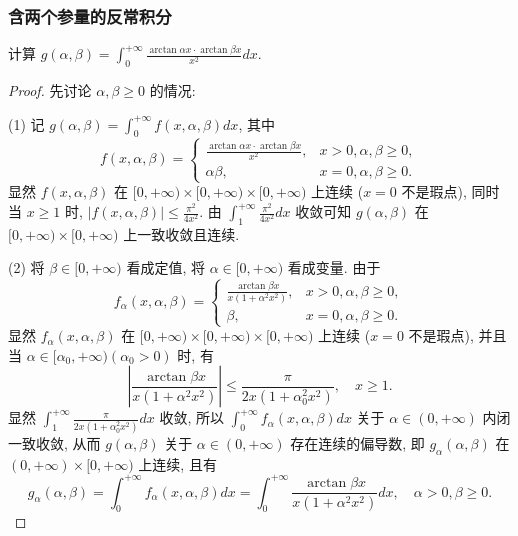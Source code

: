 \documentclass[lang=cn,newtx,10pt,scheme=chinese]{elegantbook}
\begin{document}
\subsubsection{含两个参量的反常积分}
\begin{example}
计算 $g(\alpha, \beta) = \int_{0}^{+\infty} \frac{\arctan\alpha x \cdot \arctan\beta x}{x^2} dx$.
\end{example}
\begin{proof}
先讨论 $\alpha, \beta \ge 0$ 的情况:

(1) 记 $g(\alpha, \beta) = \int_0^{+\infty} f(x, \alpha, \beta) dx$, 其中
$$f(x, \alpha, \beta) = \begin{cases} \frac{\arctan\alpha x \cdot \arctan\beta x}{x^2}, & x > 0, \alpha, \beta \ge 0, \\ \alpha\beta, & x=0, \alpha, \beta \ge 0. \end{cases}$$
显然 $f(x, \alpha, \beta)$ 在 $[0, +\infty) \times [0, +\infty) \times [0, +\infty)$ 上连续 ($x=0$ 不是瑕点), 同时当 $x \ge 1$ 时, $|f(x, \alpha, \beta)| \le \frac{\pi^2}{4x^2}$.
由 $\int_1^{+\infty} \frac{\pi^2}{4x^2} dx$ 收敛可知 $g(\alpha, \beta)$ 在 $[0, +\infty) \times [0, +\infty)$ 上一致收敛且连续.

(2) 将 $\beta \in [0, +\infty)$ 看成定值, 将 $\alpha \in [0, +\infty)$ 看成变量. 由于
$$f_\alpha(x, \alpha, \beta) = \begin{cases} \frac{\arctan \beta x}{x(1+\alpha^2x^2)}, & x > 0, \alpha, \beta \ge 0, \\ \beta, & x=0, \alpha, \beta \ge 0. \end{cases}$$
显然 $f_\alpha(x, \alpha, \beta)$ 在 $[0, +\infty) \times [0, +\infty) \times [0, +\infty)$ 上连续 ($x=0$ 不是瑕点), 并且当 $\alpha \in [\alpha_0, +\infty) (\alpha_0 > 0)$ 时, 有
$$\left| \frac{\arctan \beta x}{x(1+\alpha^2x^2)} \right| \le \frac{\pi}{2x(1+\alpha_0^2x^2)}, \quad x \ge 1.$$
显然 $\int_1^{+\infty} \frac{\pi}{2x(1+\alpha_0^2x^2)} dx$ 收敛, 所以 $\int_0^{+\infty} f_\alpha(x, \alpha, \beta) dx$ 关于 $\alpha \in (0, +\infty)$ 内闭一致收敛, 从而 $g(\alpha, \beta)$ 关于 $\alpha \in (0, +\infty)$ 存在连续的偏导数, 即 $g_\alpha(\alpha, \beta)$ 在 $(0, +\infty) \times [0, +\infty)$ 上连续, 且有
$$ g_\alpha(\alpha, \beta) = \int_0^{+\infty} f_\alpha(x, \alpha, \beta) dx = \int_0^{+\infty} \frac{\arctan\beta x}{x(1+\alpha^2x^2)} dx, \quad \alpha > 0, \beta \ge 0. $$


\end{proof}
\end{document}
